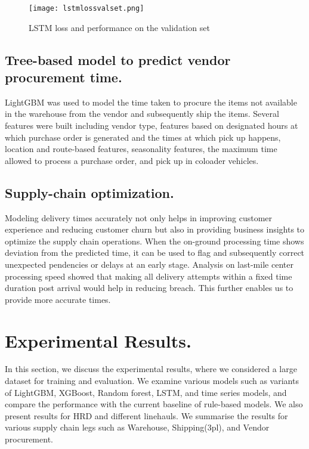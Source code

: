 \documentclass[twoside,leqno,twocolumn]{article}
\begin{document}
\begin{figure}[h]
    \texttt{[image: lstmlossvalset.png]}
\caption{LSTM loss and performance on the validation set}
    \label{fig:lstmlossvalset}
    \vspace{-2mm}
\end{figure}

\subsection{Tree-based model to predict vendor procurement time.}
LightGBM was used to model the time taken to procure the items not available in the warehouse from the vendor and subsequently ship the items. Several features were built including vendor type, features based on designated hours at which purchase order is generated and the times at which pick up happens, location and route-based features, seasonality features, the maximum time allowed to process a purchase order, and pick up in coloader vehicles.

\subsection{Supply-chain optimization.}
Modeling delivery times accurately not only helps in improving customer experience and reducing customer churn but also in providing business insights to optimize the supply chain operations. When the on-ground processing time shows deviation from the predicted time, it can be used to flag and subsequently correct unexpected pendencies or delays at an early stage. Analysis on last-mile center processing speed showed that making all delivery attempts within a fixed time duration post arrival would help in reducing breach. This further enables us to provide more accurate times.

\section{Experimental Results.}
In this section, we discuss the experimental results, where we considered a large dataset for training and evaluation. We examine various models such as variants of LightGBM, XGBoost, Random forest, LSTM, and time series models, and compare the performance with the current baseline of rule-based models. We also present results for HRD and different linehauls. We summarise the results for various supply chain legs such as Warehouse, Shipping(3pl), and Vendor procurement.
\end{document}
